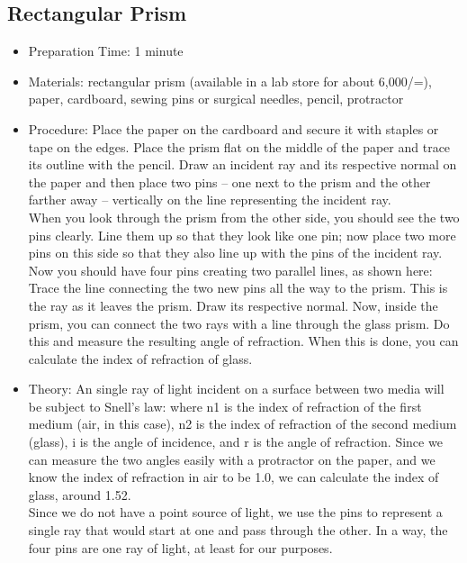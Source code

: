 \subsection{Rectangular Prism}
\begin{itemize}
\item{Preparation Time: 1 minute}
\item{Materials: rectangular prism (available in a lab store for about 6,000/=), paper, cardboard, sewing pins or surgical needles, pencil, protractor}
\item{Procedure: Place the paper on the cardboard and secure it with staples or tape on the edges. Place the prism flat on the middle of the paper and trace its outline with the pencil. Draw an incident ray and its respective normal on the paper and then place two pins – one next to the prism and the other farther away – vertically on the line representing the incident ray.\\
When you look through the prism from the other side, you should see the two pins clearly. Line them up so that they look like one pin; now place two more pins on this side so that they also line up with the pins of the incident ray. Now you should have four pins creating two parallel lines, as shown here:\\
Trace the line connecting the two new pins all the way to the prism. This is the ray as it leaves the prism. Draw its respective normal. Now, inside the prism, you can connect the two rays with a line through the glass prism. Do this and measure the resulting angle of refraction. When this is done, you can calculate the index of refraction of glass.}
\item{Theory: An single ray of light incident on a surface between two media will be subject to Snell’s law:  where n1 is the index of refraction of the first medium (air, in this case), n2 is the index of refraction of the second medium (glass), i is the angle of incidence, and r is the angle of refraction. Since we can measure the two angles easily with a protractor on the paper, and we know the index of refraction in air to be 1.0, we can calculate the index of glass, around 1.52.\\
Since we do not have a point source of light, we use the pins to represent a single ray that would start at one and pass through the other. In a way, the four pins are one ray of light, at least for our purposes.}
\end{itemize}

